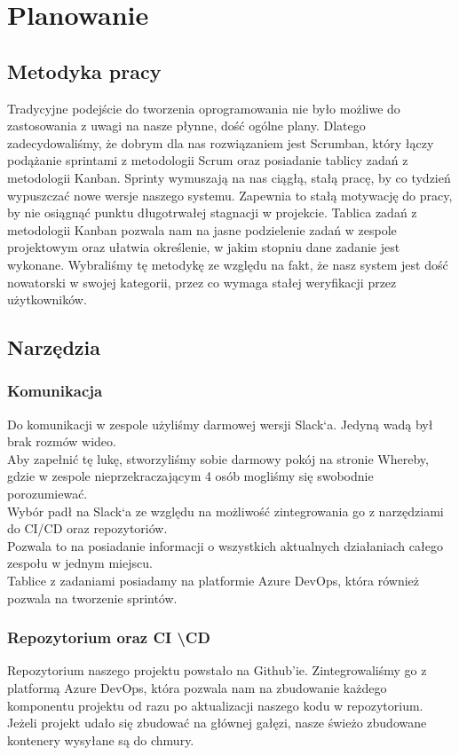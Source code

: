 \documentclass[a4paper,11pt]{report}
\begin{document}
\chapter {Planowanie}
\section{Metodyka pracy}
Tradycyjne podejście do tworzenia oprogramowania nie było możliwe do zastosowania z uwagi na nasze płynne, dość ogólne plany.
 Dlatego zadecydowaliśmy, że dobrym dla nas rozwiązaniem jest Scrumban, który łączy podążanie sprintami z metodologii Scrum
 oraz posiadanie tablicy zadań z metodologii Kanban\cite{agile}.
 Sprinty wymuszają na nas ciągłą, stałą pracę, by co tydzień wypuszczać nowe wersje naszego systemu.
 Zapewnia to stałą motywację do pracy, by nie osiągnąć punktu długotrwałej stagnacji w projekcie.
 Tablica zadań z metodologii Kanban pozwala nam na jasne podzielenie zadań w zespole projektowym
 oraz ułatwia określenie, w jakim stopniu dane zadanie jest wykonane.
 Wybraliśmy tę metodykę ze względu na fakt, że nasz system jest dość nowatorski w swojej kategorii,
 przez co wymaga stałej weryfikacji przez użytkowników.
 
 
\section{Narzędzia}
\subsection {Komunikacja}
Do komunikacji w zespole użyliśmy darmowej wersji Slack`a. Jedyną wadą był brak rozmów wideo.\\
Aby zapełnić tę lukę, stworzyliśmy sobie darmowy pokój na stronie Whereby, gdzie w zespole nieprzekraczającym 4
osób mogliśmy się swobodnie porozumiewać.\\
Wybór padł na Slack`a ze względu na możliwość zintegrowania go z narzędziami do CI/CD oraz repozytoriów.\\
Pozwala to na posiadanie informacji o wszystkich aktualnych działaniach całego zespołu w jednym miejscu.\\
Tablice z zadaniami posiadamy na platformie Azure DevOps, która również pozwala na tworzenie sprintów.\\
\subsection{Repozytorium oraz CI \textbackslash CD}
Repozytorium naszego projektu powstało na Github'ie. Zintegrowaliśmy go z platformą Azure DevOps, 
która pozwala nam na zbudowanie każdego komponentu projektu od razu po aktualizacji naszego kodu w repozytorium.\\
Jeżeli projekt udało się zbudować na głównej gałęzi, nasze świeżo zbudowane kontenery wysyłane są do chmury.\\
\end{document}
